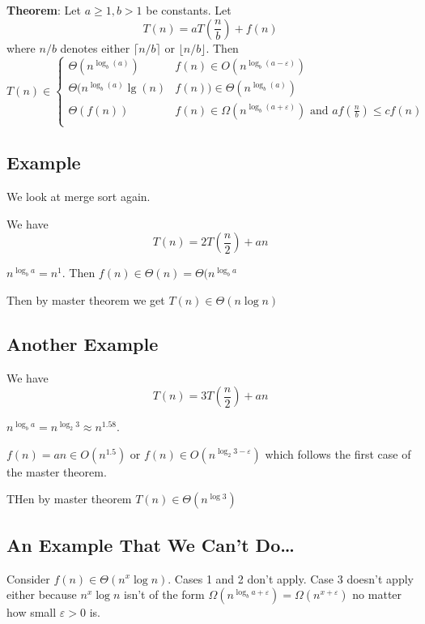 \documentclass[12pt]{article}
\begin{document}
\textbf{Theorem}: Let $a \geq 1, b > 1$ be constants. Let
\begin{equation}
    T(n) = aT\left(\frac{n}{b}\right) + f(n)
    \label{MasterCond}
\end{equation}
where $n/b$ denotes either $\lceil n/b\rceil$ or  $\lfloor n/b \rfloor$. Then
\begin{equation}
    T(n) \in \begin{cases}
        \Theta(n^{\log_b(a)}) & f(n) \in O(n^{\log_b(a - \varepsilon)})\\
        \Theta(n^{\log_b(a)}\lg(n) & f(n)) \in \Theta(n^{\log_b(a)})\\
        \Theta(f(n)) &f(n)\in \Omega(n^{\log_b(a + \varepsilon)}) \text{ and }
        af\left( \frac{n}{b} \right) \leq cf(n)\\
    \end{cases}
    \label{MasterTheorem}
\end{equation}

\subsection{Example}

We look at merge sort again.

We have
\begin{equation}
    T(n) = 2T\left( \frac{n}{2} \right) + an
\end{equation}

$n^{\log_b a} = n^1$. Then $f(n) \in \Theta(n) = \Theta(n^{\log_b a}$

Then by master theorem we get $T(n) \in \Theta( n \log n)$

\subsection{Another Example}

We have
\begin{equation}
    T(n) = 3T\left( \frac{n}{2} \right) + an
\end{equation}

$n^{\log_b a} = n^{\log_2 3} \approx n^{1.58}$.

$f(n) = an \in O(n^{1.5})$ or $f(n) \in O(n^{\log_2 3 - \varepsilon})$ which
follows the first case of the master theorem.

THen by master theorem $T(n) \in \Theta(n^{\log 3})$

\subsection{An Example That We Can't Do\dots}

Consider $f(n) \in \Theta(n^x \log n)$. Cases 1 and 2 don't apply. Case 3
doesn't apply either because $n^x \log n$ isn't of the form $\Omega(n^{\log_b a
+ \varepsilon}) = \Omega(n^{x + \varepsilon})$ no matter how small $\varepsilon
> 0$ is.
\end{document}

